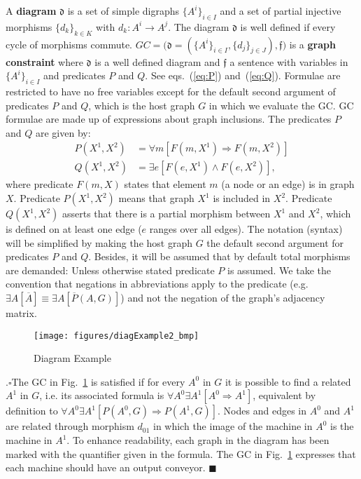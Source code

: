\documentclass{fundam}
\newcommand{\proofend}{\hfill$\blacksquare$}
\begin{document}
A \textbf{diagram} $\mathfrak{d}$ is a set of simple digraphs $\{ A^i
\}_{i \in I}$ and a set of partial injective morphisms $\{ d_k \}_{k
  \in K}$ with $d_k: A^i \rightarrow A^j$. The diagram $\mathfrak{d}$
is well defined if every cycle of morphisms commute. $GC = \big(
\mathfrak{d} = ( \{A^i \}_{i \in I}, \{ d_j \}_{j \in J} ),
\mathfrak{f} \big)$ is a \textbf{graph constraint} where
$\mathfrak{d}$ is a well defined diagram and $\mathfrak{f}$ a sentence
with variables in $\{ A^i \}_{i \in I}$ and predicates $P$ and
$Q$. See eqs.~(\ref{eq:P}) and~(\ref{eq:Q}). Formulae are restricted
to have no free variables except for the default second argument of
predicates $P$ and $Q$, which is the host graph $G$ in which we
evaluate the GC. GC formulae are made up of expressions about graph
inclusions. The predicates $P$ and $Q$ are given by:
\begin{align}
  \label{eq:P}
  P(X^1, X^2) &= \forall m [F(m, X^1) \Rightarrow F(m, X^2)] \\
  \label{eq:Q}
  Q(X^1, X^2) &= \exists e [F(e, X^1) \wedge F(e, X^2)],
\end{align}
where predicate $F(m, X)$ states that element $m$ (a node or an edge)
is in graph $X$.  Predicate $P(X^1, X^2)$ means that graph $X^1$ is
included in $X^2$. Predicate $Q(X^1, X^2)$ asserts that there is a
partial morphism between $X^1$ and $X^2$, which is defined on at least
one edge ($e$ ranges over all edges). The notation (syntax) will be
simplified by making the host graph $G$ the default second argument
for predicates $P$ and $Q$.  Besides, it will be assumed that by
default total morphisms are demanded: Unless otherwise stated
predicate $P$ is assumed. We take the convention that negations in
abbreviations apply to the predicate (e.g. $\exists A [\overline{A}]
\equiv \exists A [\overline{P}(A, G)]$) and not the negation of the
graph's adjacency matrix.

\begin{figure}[htbp]
  \centering
  \texttt{[image: figures/diagExample2\_bmp]}
  \caption{Diagram Example}
  \label{fig:DiagExample}
\end{figure}

.$\square$The GC in Fig.~\ref{fig:DiagExample}
is satisfied if for every $A^0$ in $G$ it is possible to find a
related $A^1$ in $G$, i.e. its associated formula is $\forall A^0
\exists A^1 \left[ A^0 \Rightarrow A^1\right]$, equivalent by
definition to $\forall A^0 \exists A^1 \left[ P\!\!\left(A^0, G
  \right) \Rightarrow P\!\! \left(A^1, G\right) \right]$. Nodes and
edges in $A^0$ and $A^1$ are related through morphism $d_{01}$ in
which the image of the machine in $A^0$ is the machine in $A^1$. To
enhance readability, each graph in the diagram has been marked with
the quantifier given in the formula. The GC in
Fig.~\ref{fig:DiagExample} expresses that each machine should have an
output conveyor. \proofend
\end{document}
